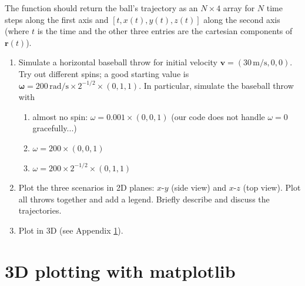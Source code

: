 \documentclass[letterpaper]{scrartcl}
\newenvironment{enuma}{\begin{enumerate}[label=(\alph*)]}{\end{enumerate}}
\newenvironment{enumi}{\begin{enumerate}[label=(\roman*)]}{\end{enumerate}}
\renewcommand{\vec}[1]{\ensuremath{\mathbf{#1}}}
\begin{document}
The function should return the ball's trajectory as an $N \times 4$
array for $N$ time steps along the first axis and
$[t, x(t), y(t), z(t)]$ along the second axis (where $t$ is the time
and the other three entries are the cartesian components of
$\vec{r}(t)$).

\begin{enuma}
\item Simulate a horizontal baseball throw for initial velocity
  $\vec{v} = (30\,\text{m/s}, 0, 0)$.  Try out different spins; a good
  starting value is
  $\boldsymbol{\omega} = 200\,\text{rad/s} \times 2^{{-1/2}} \times
  (0, 1, 1)$. In particular, simulate the baseball throw with
  \begin{enumi}
  \item almost no spin: $\omega = 0.001 \times (0, 0, 1)$ (our code
    does not handle $\omega = 0$ gracefully...)
  \item $\omega = 200 \times (0, 0, 1)$
  \item $\omega = 200 \times 2^{{-1/2}} \times (0, 1, 1)$
  \end{enumi}
\item Plot the three scenarios in 2D planes: $x$-$y$ (side view) and
  $x$-$z$ (top view). Plot all throws together and add a
  legend. Briefly describe and discuss the trajectories.
\item Plot in 3D (see Appendix \ref{sec:mpl}).
\end{enuma}


\section{3D plotting with matplotlib}
\label{sec:mpl}
\end{document}
